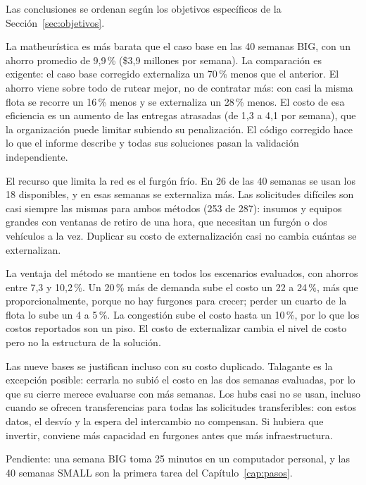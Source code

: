 Las conclusiones se ordenan según los objetivos específicos de la Sección~\ref{sec:objetivos}.

 La matheurística es más barata que el caso base en las 40 semanas BIG, con un ahorro promedio de 9,9\,\% (\$3,9 millones por semana). La comparación es exigente: el caso base corregido externaliza un 70\,\% menos que el anterior. El ahorro viene sobre todo de rutear mejor, no de contratar más: con casi la misma flota se recorre un 16\,\% menos y se externaliza un 28\,\% menos. El costo de esa eficiencia es un aumento de las entregas atrasadas (de 1,3 a 4,1 por semana), que la organización puede limitar subiendo su penalización. El código corregido hace lo que el informe describe y todas sus soluciones pasan la validación independiente.

 El recurso que limita la red es el furgón frío. En 26 de las 40 semanas se usan los 18 disponibles, y en esas semanas se externaliza más. Las solicitudes difíciles son casi siempre las mismas para ambos métodos (253 de 287): insumos y equipos grandes con ventanas de retiro de una hora, que necesitan un furgón o dos vehículos a la vez. Duplicar su costo de externalización casi no cambia cuántas se externalizan.

 La ventaja del método se mantiene en todos los escenarios evaluados, con ahorros entre 7,3 y 10,2\,\%. Un 20\,\% más de demanda sube el costo un 22 a 24\,\%, más que proporcionalmente, porque no hay furgones para crecer; perder un cuarto de la flota lo sube un 4 a 5\,\%. La congestión sube el costo hasta un 10\,\%, por lo que los costos reportados son un piso. El costo de externalizar cambia el nivel de costo pero no la estructura de la solución.

 Las nueve bases se justifican incluso con su costo duplicado. Talagante es la excepción posible: cerrarla no subió el costo en las dos semanas evaluadas, por lo que su cierre merece evaluarse con más semanas. Los hubs casi no se usan, incluso cuando se ofrecen transferencias para todas las solicitudes transferibles: con estos datos, el desvío y la espera del intercambio no compensan. Si hubiera que invertir, conviene más capacidad en furgones antes que más infraestructura.

 Pendiente: una semana BIG toma 25 minutos en un computador personal, y las 40 semanas SMALL son la primera tarea del Capítulo~\ref{cap:pasos}.
